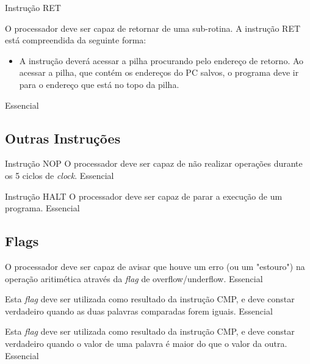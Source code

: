 \documentclass{article}
\begin{document}
\begin{functional}
      \requirement
      {Instrução RET}
      {O processador deve ser capaz de retornar de uma sub-rotina.
      A instrução RET está compreendida da seguinte forma:\\
      \begin{itemize}
         \item A instrução deverá acessar a pilha procurando pelo endereço de retorno. Ao acessar a pilha, que contém os endereços do PC salvos, o programa deve ir para o endereço que está no topo da pilha.
        \end{itemize}
        }
      {Essencial}

    \end{functional}

    \subsection{Outras Instruções}

    \begin{functional}

      \requirement
      {Instrução NOP}
      {O processador deve ser capaz de não realizar operações durante os 5 ciclos de \textit{clock}.}
      {Essencial}

      \requirement
      {Instrução HALT}
      {O processador deve ser capaz de parar a execução de um programa.}
      {Essencial}

    \end{functional}

    \subsection{Flags}

    \begin{functional}

      {O processador deve ser capaz de avisar que houve um erro (ou um "estouro") na operação aritimética através da \textit{flag} de overflow/underflow.}
      {Essencial}

      {Esta \textit{flag} deve ser utilizada como resultado da instrução CMP, e deve constar verdadeiro quando as duas palavras comparadas forem iguais.}
      {Essencial}

      {Esta \textit{flag} deve ser utilizada como resultado da instrução CMP, e deve constar verdadeiro quando o valor de uma palavra é maior do que o valor da outra.}
      {Essencial}

     \end{functional}
\end{document}
